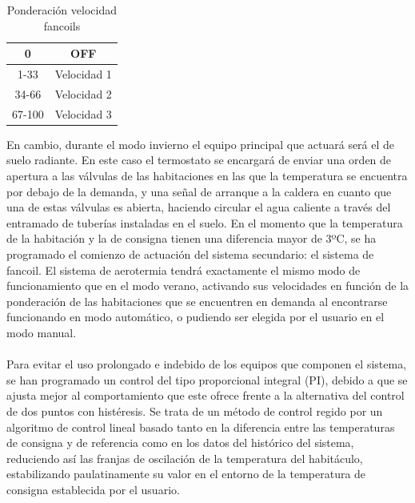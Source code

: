 \begin{itemize}
\begin{table}[H]
\begin{center}
\begin{tabular}{| c | c |}
0 & OFF \\ \hline
\rule[0mm]{0mm}{4mm}
1-33 & Velocidad 1 \\ \hline
\rule[0mm]{0mm}{4mm}
34-66 & Velocidad 2 \\ \hline
\rule[0mm]{0mm}{4mm}
67-100 & Velocidad 3 \\ \hline
\end{tabular}
\caption{Ponderación velocidad fancoils}
\label{tab:vel_fancoils}
\end{center}
\end{table}
En cambio, durante el modo invierno el equipo principal que actuará será el de suelo radiante. En este caso el termostato se encargará de enviar una orden de apertura a las válvulas de las habitaciones en las que la temperatura se encuentra por debajo de la demanda, y una señal de arranque a la caldera en cuanto que una de estas válvulas es abierta, haciendo circular el agua caliente a través del entramado de tuberías instaladas en el suelo. En el momento que la temperatura de la habitación y la de consigna tienen una diferencia mayor de 3ºC, se ha programado el comienzo de actuación del sistema secundario: el sistema de fancoil. El sistema de aerotermia tendrá exactamente el mismo modo de funcionamiento que en el modo verano, activando sus velocidades en función de la ponderación de las habitaciones que se encuentren en demanda al encontrarse funcionando en modo automático, o pudiendo ser elegida por el usuario en el modo manual. \\\\
Para evitar el uso prolongado e indebido de los equipos que componen el sistema, se han programado un control del tipo proporcional integral (PI), debido a que se ajusta mejor al comportamiento que este ofrece frente a la alternativa del control de dos puntos con histéresis. Se trata de un método de control regido por un algoritmo de control lineal basado tanto en la diferencia entre las temperaturas de consigna y de referencia como en los datos del histórico del sistema, reduciendo así las franjas de oscilación de la temperatura del habitáculo, estabilizando paulatinamente su valor en el entorno de la temperatura de consigna establecida por el usuario. \\\\

\end{itemize}
